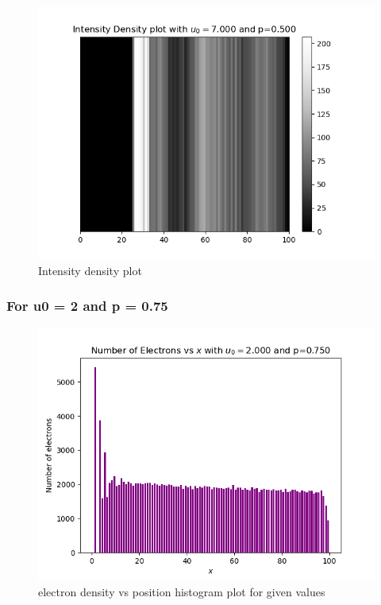 \documentclass[11pt]{article}
\begin{document}
\begin{figure}[H]
    \centering
    \includegraphics[scale = 1]{3_d.png}
    \caption{Intensity density plot}
\end{figure}

\subsubsection{For u0 = 2 and p = 0.75}

\begin{figure}[H]
    \centering
    \includegraphics[scale = 1]{4_a.png}
    \caption{electron density vs position histogram plot for given values}
\end{figure}
\end{document}
